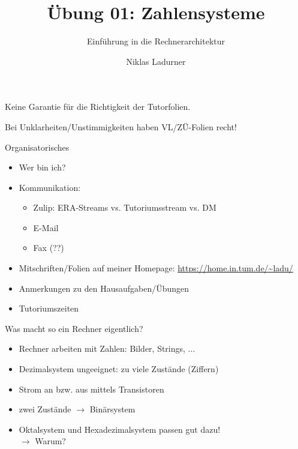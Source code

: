 \documentclass[
  german,            %
  aspectratio=169,    %
]{tumbeamer}
\title{Übung 01: Zahlensysteme}
\subtitle{Einführung in die Rechnerarchitektur}
\author{Niklas Ladurner}
\institute{\theChairName\\\theDepartmentName\\\theUniversityName}
\date{\DTMdisplaydate{2024}{10}{18}{-1}}
\begin{document}
\maketitle

\begin{frame}[c]{}{}
  \begin{center}
    \LARGE  Keine Garantie für die Richtigkeit der Tutorfolien.

    \Large Bei Unklarheiten/Unstimmigkeiten haben VL/ZÜ-Folien recht!
  \end{center}
\end{frame}

\begin{frame}[c]{Organisatorisches}{}
  \begin{itemize}
    \item Wer bin ich?
    \item Kommunikation:
          \begin{itemize}
            \item Zulip: ERA-Streams vs. Tutoriumsstream vs. DM
            \item E-Mail
            \item Fax (??)
          \end{itemize}
    \item Mitschriften/Folien auf meiner Homepage: \url{https://home.in.tum.de/~ladu/}
    \item Anmerkungen zu den Hausaufgaben/Übungen
    \item Tutoriumszeiten
  \end{itemize}
\end{frame}

\begin{frame}[c]{Was macht so ein Rechner eigentlich?}{}
  \begin{itemize}
    \item Rechner arbeiten mit Zahlen: Bilder, Strings, ...
    \item Dezimalsystem ungeeignet: zu viele Zustände (Ziffern)
    \item Strom an bzw. aus mittels Transistoren
    \item zwei Zustände $\rightarrow$ Binärsystem
    \item Oktalsystem und Hexadezimalsystem passen gut dazu! \\ $\rightarrow$ Warum?
  \end{itemize}
\end{frame}
\end{document}
